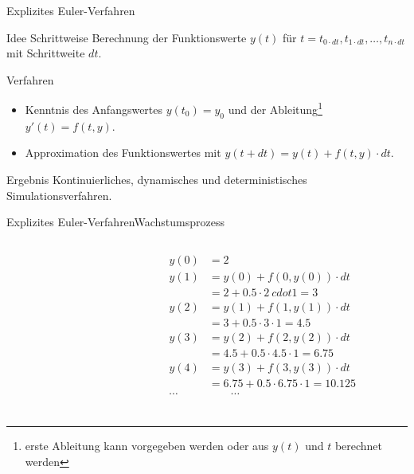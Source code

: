 \documentclass[xelatex,aspectratio=169]{beamer}
\begin{document}
\begin{frame}{Explizites Euler-Verfahren}
    \begin{block}{Idee}
        Schrittweise Berechnung der Funktionswerte $y(t)$ für $t = t_{0 \cdot dt}, t_{1 \cdot dt}, \ldots, t_{n \cdot dt}$ mit Schrittweite $dt$.
    \end{block}

    \begin{block}{Verfahren}
        \begin{itemize}
            \item Kenntnis des Anfangswertes $y(t_0) = y_0$ und der Ableitung\footnote{erste Ableitung kann vorgegeben werden oder aus $y(t)$ und $t$ berechnet werden} $y'(t) = f(t, y)$.
            \item Approximation des Funktionswertes mit $y(t + dt) = y(t) + f(t, y) \cdot dt$.
        \end{itemize}
    \end{block}

    \begin{block}{Ergebnis}
        Kontinuierliches, dynamisches und deterministisches Simulationsverfahren.

    \end{block}
\end{frame}


\begin{frame}{Explizites Euler-Verfahren}{Wachstumsprozess}
    \begin{columns}[onlytextwidth]
        \begin{column}{0.5\textwidth}
            \inputminted[firstline=7, lastline=17]{python}{src/sim_growth.py}
        \end{column}
        \begin{column}{0.5\textwidth}
            \[
                \begin{aligned}
                    y(0)   & = 2                                      \\
                    y(1)   & = y(0) + f(0, y(0)) \cdot dt             \\
                           & = 2 + 0.5 \cdot 2 \ cdot 1 = 3           \\
                    y(2)   & = y(1) + f(1, y(1)) \cdot dt             \\
                           & = 3 + 0.5 \cdot 3 \cdot 1 = 4.5          \\
                    y(3)   & = y(2) + f(2, y(2)) \cdot dt             \\
                           & = 4.5 + 0.5 \cdot 4.5 \cdot 1 = 6.75     \\
                    y(4)   & = y(3) + f(3, y(3)) \cdot dt             \\
                           & = 6.75 + 0.5 \cdot 6.75 \cdot 1 = 10.125 \\
                    \cdots & \qquad\cdots                             \\
                \end{aligned}
            \]
        \end{column}
    \end{columns}
\end{frame}
\end{document}
